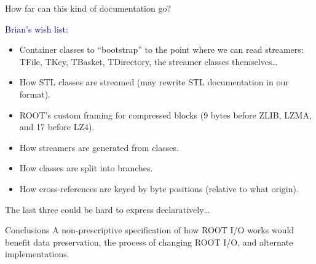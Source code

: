 \documentclass[aspectratio=169]{beamer}
\begin{document}
\begin{frame}{How far can this kind of documentation go?}
\vspace{0.5 cm}

\textcolor{darkblue}{Brian's wish list:}
\begin{itemize}\setlength{\itemsep}{0.25 cm}
\item Container classes to ``bootstrap'' to the point where we can read streamers: TFile, TKey, TBasket, TDirectory, the streamer classes themselves\ldots

\item How STL classes are streamed (may rewrite STL documentation in our format).

\item ROOT's custom framing for compressed blocks (9 bytes before ZLIB, LZMA, and 17 before LZ4).

\item How streamers are generated from classes.

\item How classes are split into branches.

\item How cross-references are keyed by byte positions (relative to what origin).
\end{itemize}

\vspace{0.25 cm}
The last three could be hard to express declaratively\ldots
\end{frame}

\begin{frame}{Conclusions}
\vspace{1 cm}
A non-prescriptive specification of how ROOT I/O works would benefit data preservation, the process of changing ROOT I/O, and alternate implementations.

\vspace{0.5 cm}

\vspace{0.5 cm}

\vspace{0.5 cm}

\begin{center}
\end{center}
\end{frame}
\end{document}
